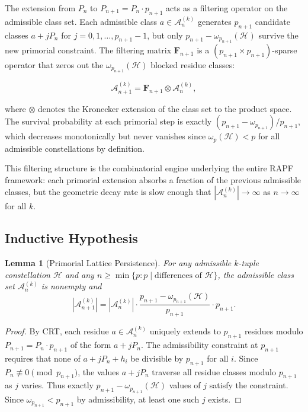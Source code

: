 \documentclass[11pt]{article}
\newtheorem{lemma}[theorem]{Lemma}
\theoremstyle{remark}
\begin{document}
The extension from $P_n$ to $P_{n+1} = P_n \cdot p_{n+1}$ acts as a
filtering operator on the admissible class set. Each admissible class
$a \in \mathcal{A}_n^{(k)}$ generates $p_{n+1}$ candidate classes
$a + j P_n$ for $j = 0, 1, \ldots, p_{n+1} - 1$, but only
$p_{n+1} - \omega_{p_{n+1}}(\mathcal{H})$ survive the new primorial
constraint. The filtering matrix $\mathbf{F}_{n+1}$ is a
$(p_{n+1} \times p_{n+1})$-sparse operator that zeros out the
$\omega_{p_{n+1}}(\mathcal{H})$ blocked residue classes:

\begin{equation}
\mathcal{A}_{n+1}^{(k)} = \mathbf{F}_{n+1} \otimes
\mathcal{A}_n^{(k)},
\label{eq:filtering}
\end{equation}

where $\otimes$ denotes the Kronecker extension of the class set to the
product space. The survival probability at each primorial step is
exactly $(p_{n+1} - \omega_{p_{n+1}}) / p_{n+1}$, which decreases
monotonically but never vanishes since $\omega_p(\mathcal{H}) < p$ for
all admissible constellations by definition.

This filtering structure is the combinatorial engine underlying the
entire RAPF framework: each primorial extension absorbs a fraction of
the previous admissible classes, but the geometric decay rate is
slow enough that $\left|\mathcal{A}_n^{(k)}\right| \to \infty$ as
$n \to \infty$ for all $k$.

\subsection{Inductive Hypothesis}

\begin{lemma}[Primorial Lattice Persistence]
\label{lem:lattice-persistence}
For any admissible $k$-tuple constellation $\mathcal{H}$ and any
$n \geq \min\{p : p \mid \text{differences of }\mathcal{H}\}$, the
admissible class set $\mathcal{A}_n^{(k)}$ is nonempty and
\begin{equation}
\left|\mathcal{A}_{n+1}^{(k)}\right| =
\left|\mathcal{A}_n^{(k)}\right| \cdot
\frac{p_{n+1} - \omega_{p_{n+1}}(\mathcal{H})}{p_{n+1}} \cdot p_{n+1}.
\end{equation}
\end{lemma}

\begin{proof}
By CRT, each residue $a \in \mathcal{A}_n^{(k)}$ uniquely extends to
$p_{n+1}$ residues modulo $P_{n+1} = P_n \cdot p_{n+1}$ of the form
$a + j P_n$. The admissibility constraint at $p_{n+1}$ requires that
none of $a + j P_n + h_i$ be divisible by $p_{n+1}$ for all $i$.
Since $P_n \not\equiv 0 \pmod{p_{n+1}}$, the values $a + j P_n$
traverse all residue classes modulo $p_{n+1}$ as $j$ varies. Thus
exactly $p_{n+1} - \omega_{p_{n+1}}(\mathcal{H})$ values of $j$
satisfy the constraint. Since $\omega_{p_{n+1}} < p_{n+1}$ by
admissibility, at least one such $j$ exists.
\end{proof}
\end{document}

